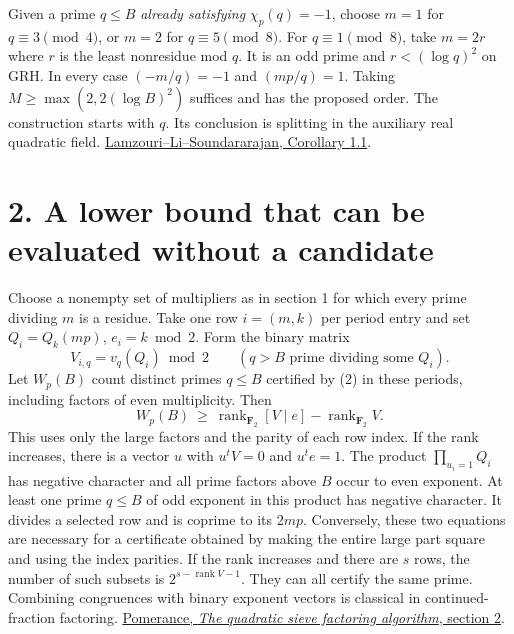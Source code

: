\documentclass[11pt]{article}
\newcommand{\ch}{\chi_p}
\newcommand{\F}{\mathbf F_2}
\newcommand{\lls}{\href{https://arxiv.org/pdf/1309.3595}{Lamzouri--Li--Soundararajan, Corollary 1.1}}
\begin{document}
Given a prime \(q\le B\) \emph{already satisfying} \(\ch(q)=-1\), choose
\(m=1\) for \(q\equiv3\pmod4\), or \(m=2\) for \(q\equiv5\pmod8\). For
\(q\equiv1\pmod8\), take \(m=2r\) where \(r\) is the least nonresidue mod \(q\).
It is an odd prime and \(r<(\log q)^2\) on GRH. In every case
\((-m/q)=-1\) and \((mp/q)=1\). Taking \(M\ge\max(2,2(\log B)^2)\)
suffices and has the proposed order. The construction starts with \(q\).
Its conclusion is splitting in the auxiliary real quadratic field. \lls.

\newpage
\section*{2. A lower bound that can be evaluated without a candidate}
Choose a nonempty set of multipliers as in section 1 for which every prime
dividing \(m\) is a residue. Take one row \(i=(m,k)\) per period entry
and set \(Q_i=Q_k(mp)\), \(e_i=k\bmod2\). Form the binary matrix
\[
 V_{i,q}=v_q(Q_i)\bmod2 \qquad(q>B\text{ prime dividing some }Q_i).
\]
Let \(W_p(B)\) count distinct primes \(q\le B\) certified by (2) in these
periods, including factors of even multiplicity. Then
\begin{equation}
 W_p(B)\ \ge\
 \operatorname{rank}_{\F}[V\mid e]-\operatorname{rank}_{\F}V .
\end{equation}
This uses only the large factors and the parity of each row index. If the
rank increases, there is a vector \(u\) with \(u^tV=0\) and \(u^te=1\).
The product \(\prod_{u_i=1}Q_i\) has negative character and all prime factors
above \(B\) occur to even exponent. At least one prime \(q\le B\) of odd
exponent in this product has negative character. It divides a selected row
and is coprime to its \(2mp\). Conversely, these two equations are necessary
for a certificate obtained by making the entire large part square and using
the index parities. If the rank increases and there are \(s\) rows, the
number of such subsets is \(2^{s-\operatorname{rank}V-1}\). They can all
certify the same prime. Combining congruences with binary exponent vectors
is classical in continued-fraction factoring.
\href{https://math.dartmouth.edu/~carlp/PDF/paper52.pdf}{Pomerance, \emph{The quadratic sieve factoring algorithm}, section 2}.
\end{document}
